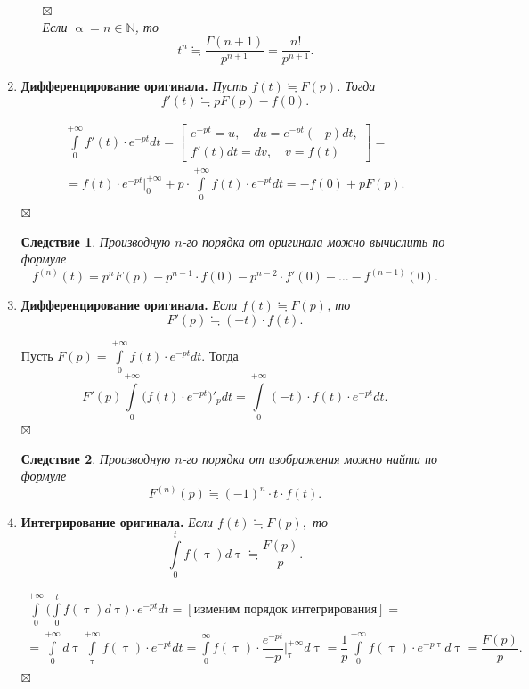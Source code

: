 \documentclass[a4paper, 12pt]{article}
\newenvironment{Proof} %
{\par\noindent{$\blacklozenge$}} %
{\hfill$\scriptstyle\boxtimes$}
\newcommand{\N}{\mathbb{N}}
\renewcommand{\alpha}{\upalpha}
\renewcommand{\tau}{\uptau}
\newtheorem*{cor}{Следствие}
\begin{document}
\begin{enumerate}
\begin{enumerate}
\begin{Proof}
		\end{Proof}\\
		\textit{Если $\alpha = n \in \N$, то $$t^n  \fallingdotseq \dfrac{\Gamma(n + 1)}{p^{n + 1}} = \dfrac{n!}{p^{n+1}}.$$}
	\end{enumerate}
		\item \textbf{Дифференцирование оригинала.} \textit{Пусть $f(t) \fallingdotseq F(p)$. Тогда} $$f'(t) \fallingdotseq pF(p) - f(0).$$
		\begin{Proof}
			\begin{multline*}
				\int\limits_0^{+\infty} f'(t)\cdot  e^{-pt}dt = \left[\begin{gathered}
					e^{-pt} = u,\quad du = e^{-pt}(-p)dt,\\
					f'(t)dt = dv,\quad v = f(t)
				\end{gathered}\right] =\\= f(t)\cdot e^{-pt}\Big|_0^{+\infty} + p\cdot \int\limits_0^{+\infty} f(t)\cdot e^{-pt}dt = -f(0) +pF(p).
			\end{multline*}
		\end{Proof}
		\begin{cor}
			Производную $n$-го порядка от оригинала можно вычислить по формуле $$f^{(n)} (t) = p^nF(p) - p^{n-1}\cdot f(0) - p^{n-2}\cdot f'(0) - \ldots - f^{(n-1)}(0).$$
		\end{cor}
		\item \textbf{Дифференцирование оригинала.} \textit{Если $f(t) \fallingdotseq F(p)$, то} $$F'(p) \fallingdotseq (-t)\cdot f(t).$$
		\begin{Proof}
			Пусть $F(p) = \int\limits_0^{+\infty}f(t)\cdot e^{-pt} dt$. Тогда $$F'(p) \int\limits_0^{+\infty}\Big(f(t)\cdot e^{-pt}\Big)'_pdt = \int\limits_0^{+\infty}(-t)\cdot f(t)\cdot e^{-pt}dt.$$
		\end{Proof}
		\begin{cor}
			Производную $n$-го порядка от изображения можно найти по формуле $$F^{(n)}(p) \fallingdotseq (-1)^n\cdot t\cdot  f(t).$$
		\end{cor}
		\item \textbf{Интегрирование оригинала.} \textit{Если $f(t) \fallingdotseq F(p),$ то} $$\int\limits_0^t f(\tau)d\tau \fallingdotseq \dfrac{F(p)}{p}.$$
		\begin{Proof}
			\begin{multline*}
				\int\limits_0^{+\infty}\Big(\int\limits_0^t f(\tau)d\tau\Big)\cdot e^{-pt}dt = [\text{изменим порядок интегрирования}] =\\= \int\limits_0^{+\infty}d\tau \int\limits_\tau^{+\infty} f(\tau)\cdot e^{-pt}dt = \int\limits_0^{\infty} f(\tau)\cdot \dfrac{e^{-pt}}{-p}\Big|_\tau^{+\infty}d\tau = \dfrac{1}{p} \int\limits_0^{+\infty}f(\tau)\cdot e^{-p\tau}d\tau = \dfrac{F(p)}{p}.

\end{multline*}
\end{Proof}
\end{enumerate}
\end{document}
